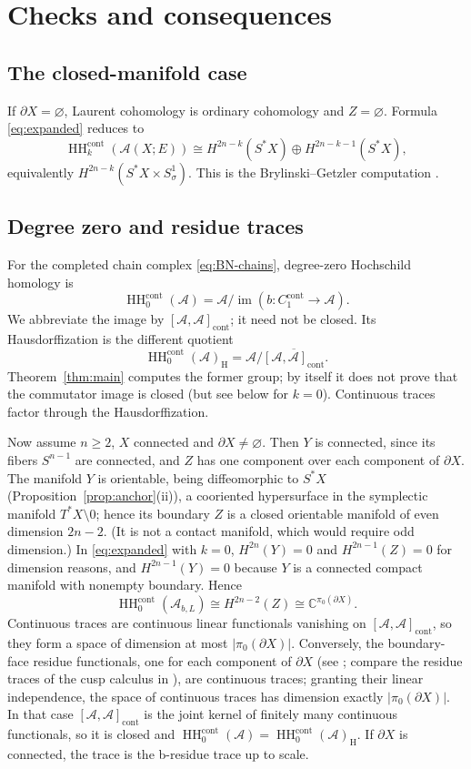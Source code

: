 \documentclass[11pt,oneside,reqno]{article}
\DeclareMathOperator{\HH}{HH}
\newcommand{\C}{\mathbb C}
\newcommand{\cA}{\mathcal A}
\theoremstyle{plain}
\theoremstyle{definition}
\theoremstyle{remark}
\begin{document}
\section{Checks and consequences}\label{sec:checks}

\subsection{The closed-manifold case}

If \(\partial X=\varnothing\), Laurent cohomology is ordinary cohomology and
\(Z=\varnothing\). Formula \eqref{eq:expanded} reduces to
\[
 \HH_k^{\mathrm{cont}}(\cA(X;E))
 \cong H^{2n-k}(S^*X)
 \oplus H^{2n-k-1}(S^*X),
\]
equivalently \(H^{2n-k}(S^*X\times S^1_\sigma)\). This is the
Brylinski--Getzler computation \cite{BG}.

\subsection{Degree zero and residue traces}

For the completed chain complex \eqref{eq:BN-chains}, degree-zero
Hochschild homology is
\[
 \HH_0^{\mathrm{cont}}(\cA)
 =\cA/\operatorname{im}(b:C_1^{\mathrm{cont}}\to\cA).
\]
We abbreviate the image by \([\cA,\cA]_{\mathrm{cont}}\); it need not be
closed.  Its Hausdorffization is the different quotient
\[
 \HH_0^{\mathrm{cont}}(\cA)_{\mathrm H}
 =\cA/\overline{[\cA,\cA]_{\mathrm{cont}}}.
\]
Theorem~\ref{thm:main} computes the former group; by itself it does not
prove that the commutator image is closed (but see below for \(k=0\)).
Continuous traces factor through the Hausdorffization.

Now assume \(n\geq2\), \(X\) connected and \(\partial X\neq\varnothing\).
Then \(Y\) is connected, since its fibers \(S^{n-1}\) are connected, and
\(Z\) has one component over each component of \(\partial X\). The
manifold \(Y\) is orientable, being diffeomorphic to \(S^*X\)
(Proposition~\ref{prop:anchor}(ii)), a cooriented hypersurface in the
symplectic manifold \(T^*X\setminus0\); hence its boundary \(Z\) is a
closed orientable manifold of even dimension \(2n-2\). (It is not a contact
manifold, which would require odd dimension.) In \eqref{eq:expanded} with
\(k=0\), \(H^{2n}(Y)=0\) and \(H^{2n-1}(Z)=0\) for dimension reasons, and
\(H^{2n-1}(Y)=0\) because \(Y\) is a connected compact manifold with
nonempty boundary. Hence
\[
 \HH_0^{\mathrm{cont}}(\cA_{b,L})\cong H^{2n-2}(Z)\cong\C^{\pi_0(\partial X)}.
\]
Continuous traces are continuous linear functionals vanishing on
\([\cA,\cA]_{\mathrm{cont}}\), so they form a space of dimension at most
\(|\pi_0(\partial X)|\). Conversely, the boundary-face residue functionals,
one for each component of \(\partial X\) (see \cite{BNfamilies}; compare
the residue traces of the cusp calculus in \cite{MN}), are
continuous traces; granting their linear independence, the space of
continuous traces has dimension exactly \(|\pi_0(\partial X)|\). In that
case \([\cA,\cA]_{\mathrm{cont}}\) is the joint kernel of finitely many
continuous functionals, so it is closed and
\(\HH_0^{\mathrm{cont}}(\cA)=\HH_0^{\mathrm{cont}}(\cA)_{\mathrm H}\). If
\(\partial X\) is connected, the trace is the b-residue trace up to scale.
\end{document}
